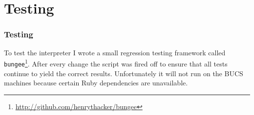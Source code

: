 \chapter{Testing}
\subsection{Testing}
To test the interpreter I wrote a small regression testing framework called \verb!bungee!\footnote{\url{http://github.com/henrythacker/bungee}}. After every change the script was fired off to ensure that all tests continue to yield the correct results. Unfortunately it will not run on the BUCS machines because certain Ruby dependencies are unavailable.